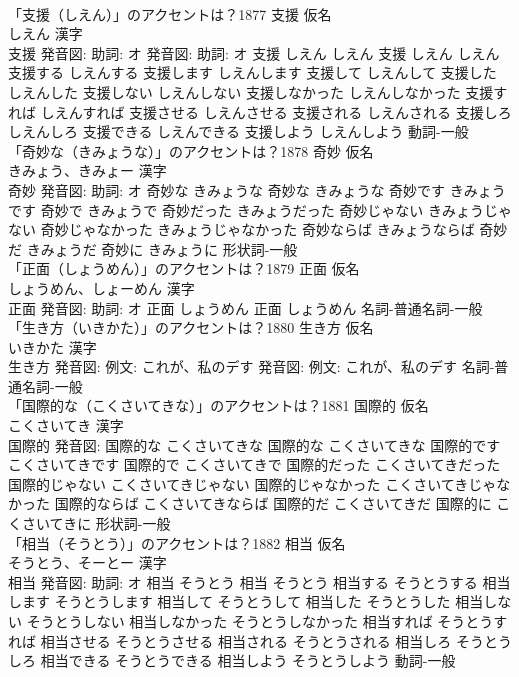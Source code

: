 \documentclass[8pt]{extreport}
\begin{document}
\begin{CJK}{UTF8}{min}
\\	「支援（しえん）」のアクセントは？1877	支援 仮名　
\\	しえん 漢字　
\\	支援 発音図: 助詞: オ 発音図: 助詞: オ	支援 しえん しえん		支援 しえん しえん 支援する しえんする 支援します しえんします 支援して しえんして 支援した しえんした 支援しない しえんしない 支援しなかった しえんしなかった 支援すれば しえんすれば 支援させる しえんさせる 支援される しえんされる 支援しろ しえんしろ 支援できる しえんできる 支援しよう しえんしよう				動詞-一般 
\\	「奇妙な（きみょうな）」のアクセントは？1878	奇妙 仮名　
\\	きみょう、きみょー 漢字　
\\	奇妙 発音図: 助詞: オ	奇妙な きみょうな		奇妙な きみょうな 奇妙です きみょうです 奇妙で きみょうで 奇妙だった きみょうだった 奇妙じゃない きみょうじゃない 奇妙じゃなかった きみょうじゃなかった 奇妙ならば きみょうならば 奇妙だ きみょうだ 奇妙に きみょうに				形状詞-一般 
\\	「正面（しょうめん）」のアクセントは？1879	正面 仮名　
\\	しょうめん、しょーめん 漢字　
\\	正面 発音図: 助詞: オ	正面 しょうめん		正面 しょうめん				名詞-普通名詞-一般 
\\	「生き方（いきかた）」のアクセントは？1880	生き方 仮名　
\\	いきかた 漢字　
\\	生き方 発音図: 例文: これが、私のデす 発音図: 例文: これが、私のデす							名詞-普通名詞-一般 
\\	「国際的な（こくさいてきな）」のアクセントは？1881	国際的 仮名　
\\	こくさいてき 漢字　
\\	国際的 発音図:	国際的な こくさいてきな		国際的な こくさいてきな 国際的です こくさいてきです 国際的で こくさいてきで 国際的だった こくさいてきだった 国際的じゃない こくさいてきじゃない 国際的じゃなかった こくさいてきじゃなかった 国際的ならば こくさいてきならば 国際的だ こくさいてきだ 国際的に こくさいてきに				形状詞-一般 
\\	「相当（そうとう）」のアクセントは？1882	相当 仮名　
\\	そうとう、そーとー 漢字　
\\	相当 発音図: 助詞: オ	相当 そうとう		相当 そうとう 相当する そうとうする 相当します そうとうします 相当して そうとうして 相当した そうとうした 相当しない そうとうしない 相当しなかった そうとうしなかった 相当すれば そうとうすれば 相当させる そうとうさせる 相当される そうとうされる 相当しろ そうとうしろ 相当できる そうとうできる 相当しよう そうとうしよう				動詞-一般 

\end{CJK}
\end{document}
